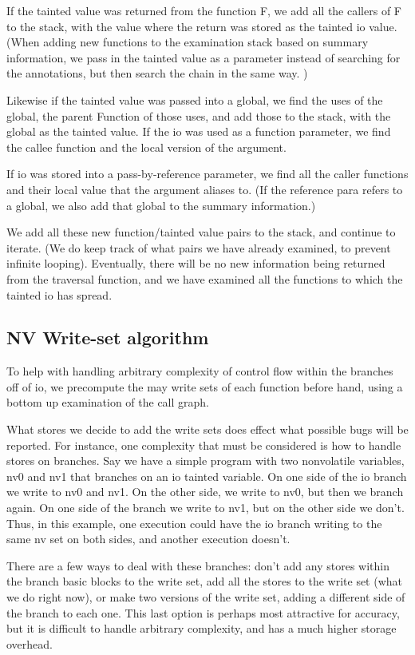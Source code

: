 If the tainted value was returned from the function F, we add all the callers of F to the stack, with the value where the return was stored as the tainted io value. (When adding new functions to the examination stack based on summary information, we pass in the tainted value as a parameter instead of searching for the annotations, but then search the chain in the same way. )
	
Likewise if the tainted value was passed into a global, we find the uses of the global, the parent Function of those uses, and add those to the stack, with the global as the tainted value. If the io was used as a function parameter, we find the callee function and the local version of the argument. 
	
If io was stored into a pass-by-reference parameter, we find all the caller functions and their local value that the argument aliases to. (If the reference para refers to a global, we also add that global to the summary information.)
	
We add all these new function/tainted value pairs to the stack, and continue to iterate. (We do keep track of what pairs we have already examined, to prevent infinite looping). Eventually, there will be no new information being returned from the traversal function, and we have examined all the functions to which the tainted io has spread. 
	
\subsection{NV Write-set algorithm}

To help with handling arbitrary complexity of control flow within the branches off of io, we precompute the may write sets of each function before hand, using a bottom up examination of the call graph. 
	
What stores we decide to add the write sets does effect what possible bugs will be reported. For instance, one complexity that must be considered is how to handle stores on branches. Say we have a simple program with two nonvolatile variables, nv0 and nv1 that branches on an io tainted variable. On one side of the io branch we write to nv0 and nv1. On the other side, we write to nv0, but then we branch again. On one side of the branch we write to nv1, but on the other side we don't. Thus, in this example, one execution could have the io branch writing to the same nv set on both sides, and another execution doesn't.
	
There are a few ways to deal with these branches: don't add any stores within the branch basic blocks to the write set, add all the stores to the write set (what we do right now), or make two versions of the write set, adding a different side of the branch to each one. This last option is perhaps most attractive for accuracy, but it is difficult to handle arbitrary complexity, and has a much higher storage overhead.
	
